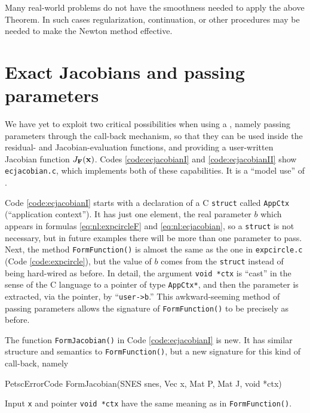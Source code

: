 Many real-world problems do not have the smoothness needed to apply the above Theorem.  In such cases regularization, continuation, or other procedures may be needed to make the Newton method effective.


\section{Exact Jacobians and passing parameters}

We have yet to exploit two critical possibilities when using a \pSNES, namely passing parameters through the call-back mechanism, so that they can be used inside the residual- and Jacobian-evaluation functions, and providing a user-written Jacobian function $J_{\mathbf{F}}(\mathbf{x})$.  Codes \ref{code:ecjacobianI} and \ref{code:ecjacobianII} show  \texttt{ecjacobian.c}, which implements both of these capabilities.  It is a ``model use'' of \pSNES.

Code \ref{code:ecjacobianI} starts with a declaration of a C \texttt{struct} called \texttt{AppCtx} (``application context'').  It has just one element, the real parameter $b$ which appears in formulas \eqref{eq:nl:expcircleF} and \eqref{eq:nl:ecjacobian}, so a \texttt{struct} is not necessary, but in future examples there will be more than one parameter to pass.  Next, the method \texttt{FormFunction()} is almost the same as the one in \texttt{expcircle.c} (Code \ref{code:expcircle}), but the value of $b$ comes from the \texttt{struct} instead of being hard-wired as before.  In detail, the argument \texttt{void *ctx} is ``cast'' in the sense of the C language \citep{KernighanRitchie1988} to a pointer of type \texttt{AppCtx*}, and then the parameter is extracted, via the pointer, by ``\texttt{user->b}.''  This awkward-seeming method of passing parameters allows the signature of \texttt{FormFunction()} to be precisely as before.


The function \texttt{FormJacobian()} in Code \ref{code:ecjacobianI} is new.  It has similar structure and semantics to \texttt{FormFunction()}, but a new signature for this kind of call-back, namely
\begin{code}
PetscErrorCode FormJacobian(SNES snes, Vec x, Mat P, Mat J, void *ctx)
\end{code}
Input \pVec \texttt{x} and pointer \texttt{void *ctx} have the same meaning as in \texttt{FormFunction()}.

